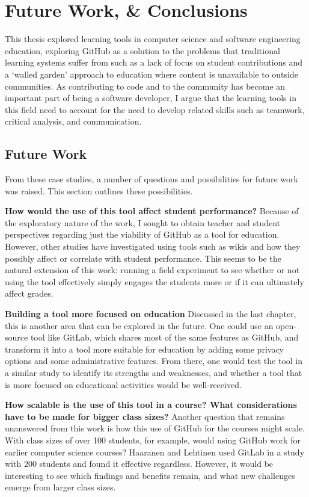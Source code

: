 \chapter{Future Work, \& Conclusions}

This thesis explored learning tools in computer science and software engineering education, exploring GitHub as a solution to the problems that traditional learning systems suffer from such as a lack of focus on student contributions and a `walled garden' approach to education where content is unavailable to outside communities. As contributing to code and to the community has become an important part of being a software developer, I argue that the learning tools in this field need to account for the need to develop related skills such as teamwork, critical analysis, and communication.

\section{Future Work}
From these case studies, a number of questions and possibilities for future work was raised. This section outlines these possibilities.

\textbf{How would the use of this tool affect student performance?}
Because of the exploratory nature of the work, I sought to obtain teacher and student perspectives regarding just the viability of GitHub as a tool for education. However, other studies have investigated using tools such as wikis \cite{minocha2007collaborative} and how they possibly affect or correlate with student performance. This seems to be the natural extension of this work: running a field experiment to see whether or not using the tool effectively simply engages the students more or if it can ultimately affect grades.

\textbf{Building a tool more focused on education}
Discussed in the last chapter, this is another area that can be explored in the future. One could use an open-source tool like GitLab, which shares most of the same features as GitHub, and transform it into a tool more suitable for education by adding some privacy options and some administrative features. From there, one would test the tool in a similar study to identify its strengths and weaknesses, and whether a tool that is more focused on educational activities would be well-received.

\textbf{How scalable is the use of this tool in a course? What considerations have to be made for bigger class sizes?}
Another question that remains unanswered from this work is how this use of GitHub for the courses might scale. With class sizes of over 100 students, for example, would using GitHub work for earlier computer science courses? Haaranen and Lehtinen \cite{haaranen2015teaching} used GitLab in a study with 200 students and found it effective regardless. However, it would be interesting to see which findings and benefits remain, and what new challenges emerge from larger class sizes.

